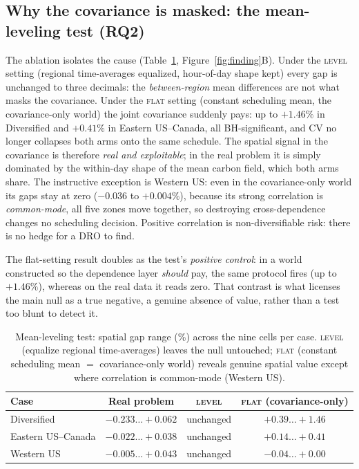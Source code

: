 \documentclass[12pt]{article}
\begin{document}
\subsection{Why the covariance is masked: the mean-leveling test
(RQ2)}\label{sec:res-ablation}
The ablation isolates the cause (Table~\ref{tab:ablation},
Figure~\ref{fig:finding}B). Under the \textsc{level} setting (regional
time-averages equalized, hour-of-day shape kept) every gap is unchanged to
three decimals: the \emph{between-region} mean differences are not what masks the
covariance. Under the \textsc{flat} setting (constant scheduling mean, the
covariance-only world) the joint covariance suddenly pays: up to $+1.46\%$ in
Diversified and $+0.41\%$ in Eastern US--Canada, all BH-significant, and CV no
longer collapses both arms onto the same schedule. The spatial signal in the
covariance is therefore \emph{real and exploitable}; in the real problem it is
simply dominated by the within-day shape of the mean carbon field, which both arms
share. The instructive exception is Western US: even in the covariance-only
world its gaps stay at zero ($-0.036$ to $+0.004\%$), because its strong
correlation is \emph{common-mode}, all five zones move together, so destroying
cross-dependence changes no scheduling decision. Positive correlation is
non-diversifiable risk: there is no hedge for a DRO to find.

The flat-setting result doubles as the test's \emph{positive control}: in a world
constructed so the dependence layer \emph{should} pay, the same protocol fires (up to
$+1.46\%$), whereas on the real data it reads zero. That contrast is what licenses the
main null as a true negative, a genuine absence of value, rather than a test too blunt to
detect it.

\begin{table}[t]
\centering\small
\caption{Mean-leveling test: spatial gap range (\%) across the nine cells per case.
\textsc{level} (equalize regional time-averages) leaves the null untouched;
\textsc{flat} (constant scheduling mean $=$ covariance-only world) reveals genuine
spatial value except where correlation is common-mode (Western US).}
\label{tab:ablation}
\begin{tabular}{lccc}
\toprule
Case & Real problem & \textsc{level} & \textsc{flat} (covariance-only)\\
\midrule
Diversified & $-0.233\ldots+0.062$ & unchanged & $+0.39\ldots+1.46$\\
Eastern US--Canada      & $-0.022\ldots+0.038$ & unchanged & $+0.14\ldots+0.41$\\
Western US   & $-0.005\ldots+0.043$ & unchanged & $-0.04\ldots+0.00$\\
\bottomrule
\end{tabular}
\end{table}
\end{document}
